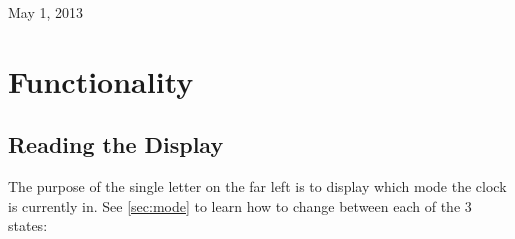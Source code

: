 \documentclass[12pt,a4paper,hidelinks]{article}            %
\begin{document}
\begin{titlepage}
{\large May 1, 2013}\\[3cm]                                     %


\vspace*{\fill}                                            %

\end{titlepage}


\tableofcontents                                           %
\newpage


\section{Functionality}

\subsection{Reading the Display}

\begin{figure}[H]
\centering
{}
\label{fig:modedisplay}
\end{figure}

The purpose of the single letter on the far left is to display which mode the clock is currently in. See \cref{sec:mode} to learn how to change between each of the 3 states: 
\end{document}
